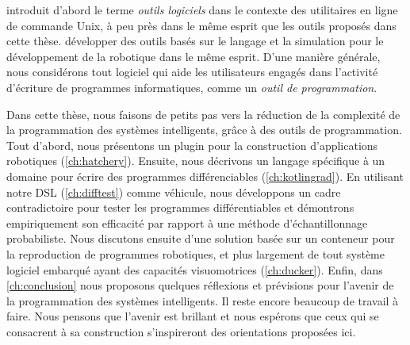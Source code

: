 %
%
\citet{kernighan1976software} introduit d'abord le terme \textit{outils logiciels} dans le contexte des utilitaires en ligne de commande Unix, à peu près dans le même esprit que les outils proposés dans cette thèse. \citet{thrun2000towards, erez2015simulation} développer des outils basés sur le langage et la simulation pour le développement de la robotique dans le même esprit. D'une manière générale, nous considérons tout logiciel qui aide les utilisateurs engagés dans l'activité d'écriture de programmes informatiques, comme un \textit{outil de programmation}.

Dans cette thèse, nous faisons de petits pas vers la réduction de la complexité de la programmation des systèmes intelligents, grâce à des outils de programmation. Tout d'abord, nous présentons un plugin pour la construction d'applications robotiques (\autoref{ch:hatchery}). Ensuite, nous décrivons un langage spécifique à un domaine pour écrire des programmes différenciables (\autoref{ch:kotlingrad}). En utilisant notre DSL (\autoref{ch:difftest}) comme véhicule, nous développons un cadre contradictoire pour tester les programmes différentiables et démontrons empiriquement son efficacité par rapport à une méthode d'échantillonnage probabiliste. Nous discutons ensuite d'une solution basée sur un conteneur pour la reproduction de programmes robotiques, et plus largement de tout système logiciel embarqué ayant des capacités visuomotrices (\autoref{ch:ducker}). Enfin, dans \autoref{ch:conclusion} nous proposons quelques réflexions et prévisions pour l'avenir de la programmation des systèmes intelligents. Il reste encore beaucoup de travail à faire. Nous pensons que l'avenir est brillant et nous espérons que ceux qui se consacrent à sa construction s'inspireront des orientations proposées ici.

